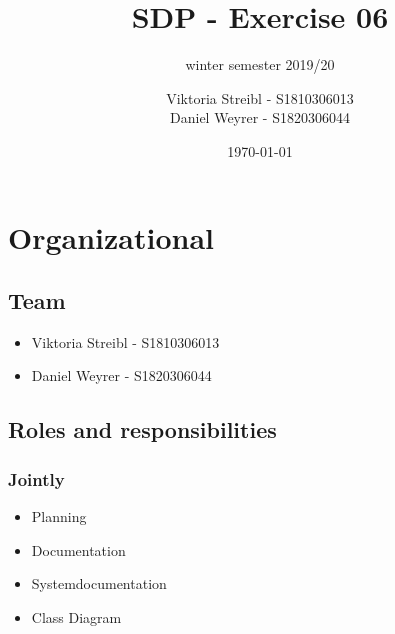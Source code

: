 

\graphicspath{{./}}



\title{SDP - Exercise 06} %
\subtitle{winter semester 2019/20} %
\author{
Viktoria Streibl - S1810306013\\
  Daniel Weyrer - S1820306044
} %
\date{\today} %

\maketitle %

\newpage
\tableofcontents %
\newpage


\section{Organizational}
\subsection{Team}
\begin{itemize}
	\item Viktoria 	Streibl 		- 	S1810306013
	\item Daniel 	Weyrer		-	S1820306044
\end{itemize}

\subsection{Roles and responsibilities}
\subsubsection{Jointly}
\begin{itemize}
	\item Planning
	\item Documentation
	\item Systemdocumentation
	\item Class Diagram
\end{itemize}

